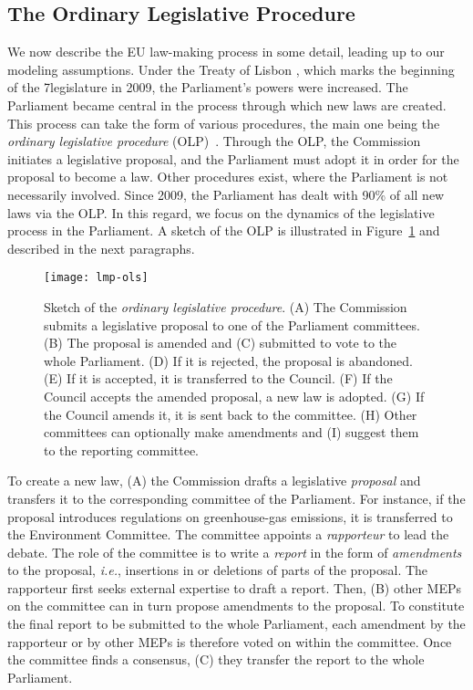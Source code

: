 \subsection{The Ordinary Legislative Procedure}

We now describe the EU law-making process in some detail, leading up to our modeling assumptions.
Under the Treaty of Lisbon \cite{eu2007lisbon}, which marks the beginning of the 7\th legislature in 2009, the Parliament's powers were increased.
The Parliament became central in the process through which new laws are created.
This process can take the form of various procedures, the main one being the \textit{ordinary legislative procedure} (OLP)~\cite{europarl2018ordinary}.
Through the OLP, the Commission initiates a legislative proposal, and the Parliament must adopt it in order for the proposal to become a law.
Other procedures exist, where the Parliament is not necessarily involved.
Since 2009, the Parliament has dealt with 90\% of all new laws via the OLP.
In this regard, we focus on the dynamics of the legislative process in the Parliament.
A sketch of the OLP is illustrated in Figure~\ref{lmp:fig:ols} and described in the next paragraphs.

\begin{figure}
  \centering
	\texttt{[image: lmp-ols]}
	\caption{
		Sketch of the \textit{ordinary legislative procedure}.
		(A) The Commission submits a legislative proposal to one of the Parliament committees.
		(B) The proposal is amended and (C) submitted to vote to the whole Parliament.
		(D) If it is rejected, the proposal is abandoned.
		(E) If it is accepted, it is transferred to the Council.
		(F) If the Council accepts the amended proposal, a new law is adopted.
		(G) If the Council amends it, it is sent back to the committee.
		(H) Other committees can optionally make amendments and (I) suggest them to the reporting committee.
	}
	\label{lmp:fig:ols}
\end{figure}

To create a new law, (A) the Commission drafts a legislative \textit{proposal} and transfers it to the corresponding committee of the Parliament.
For instance, if the proposal introduces regulations on greenhouse-gas emissions, it is transferred to the Environment Committee.
The committee appoints a \textit{rapporteur} to lead the debate.
The role of the committee is to write a \textit{report} in the form of \textit{amendments} to the proposal, \textit{i.e.}, insertions in or deletions of parts of the proposal.
The rapporteur first seeks external expertise to draft a report.
Then, (B) other MEPs on the committee can in turn propose amendments to the proposal.
To constitute the final report to be submitted to the whole Parliament, each amendment by the rapporteur or by other MEPs is therefore voted on within the committee.
Once the committee finds a consensus, (C) they transfer the report to the whole Parliament.

